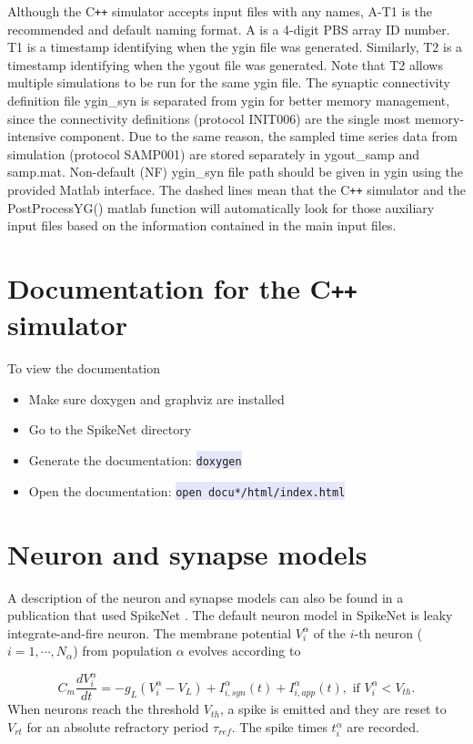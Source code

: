 \documentclass{article}
\newcommand{\mylstinline}[1] {\colorbox{Lavender}{\lstinline[basicstyle=\ttfamily\footnotesize\color{Black}]|#1|} }
\begin{document}
Although the C\texttt{++} simulator accepts input files with any names, A-T1 is the recommended and default naming format.
A is a 4-digit PBS array ID number.
T1 is a timestamp identifying when the ygin file was generated.
Similarly, T2 is a timestamp identifying when the ygout file was generated.
Note that T2 allows multiple simulations to be run for the same ygin file.
The synaptic connectivity definition file ygin\_syn is separated from ygin for better memory management, since the connectivity definitions (protocol INIT006) are the single most memory-intensive component.
Due to the same reason, the sampled time series data from simulation (protocol SAMP001) are stored separately in ygout\_samp and samp.mat.
Non-default (NF) ygin\_syn file path should be given in ygin using the provided Matlab interface.
The dashed lines mean that the C\texttt{++} simulator and the PostProcessYG() matlab function will automatically look for those auxiliary input files based on the information contained in the main input files.


\section{Documentation for the C\texttt{++} simulator}
To view the documentation
\begin{itemize}
\item Make sure doxygen and graphviz are installed
\item Go to the SpikeNet directory
\item Generate the documentation: \mylstinline{doxygen}
\item Open the documentation: \mylstinline{open docu*/html/index.html}
\end{itemize}



\section{Neuron and synapse models}
\label{sec:model}

A description of the neuron and synapse models can also be found in a publication that used SpikeNet \cite{Gu2016}.
The default neuron model in SpikeNet is leaky integrate-and-fire neuron. 
The membrane potential $V^{\alpha}_{i}$ of the $i$-th neuron ($i=1,\cdots,N_{\alpha}$) from population $\alpha$ evolves according to

\begin{equation}
C_{m}\frac{dV^{\alpha}_{i}}{dt} = -g_{L}(V^{\alpha}_{i}-V_{L}) + I^{\alpha}_{i,syn}(t) + I^{\alpha}_{i,app}(t), \text{ if } V^{\alpha}_{i} < V_{th}.
\end{equation}
When neurons reach the threshold $V_{th}$, a spike is emitted and they are reset to $V_{rt}$ for an absolute refractory period $\tau_{ref}$. 
The spike times $t^{\alpha}_{i}$ are recorded.
\end{document}
